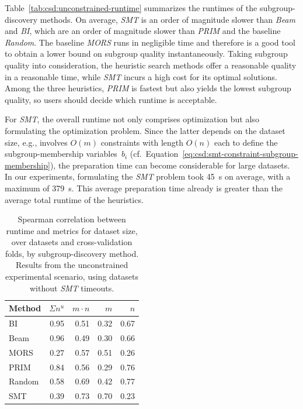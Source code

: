 \documentclass{article}
\theoremstyle{definition}
\begin{document}
Table~\ref{tab:csd:unconstrained-runtime} summarizes the runtimes of the subgroup-discovery methods.
On average, \emph{SMT} is an order of magnitude slower than \emph{Beam} and \emph{BI}, which are an order of magnitude slower than \emph{PRIM} and the baseline \emph{Random}.
The baseline \emph{MORS} runs in negligible time and therefore is a good tool to obtain a lower bound on subgroup quality instantaneously.
Taking subgroup quality into consideration, the heuristic search methods offer a reasonable quality in a reasonable time, while \emph{SMT} incurs a high cost for its optimal solutions.
Among the three heuristics, \emph{PRIM} is fastest but also yields the lowest subgroup quality, so users should decide which runtime is acceptable.

For \emph{SMT}, the overall runtime not only comprises optimization but also formulating the optimization problem.
Since the latter depends on the dataset size, e.g., involves $O(m)$ constraints with length $O(n)$ each to define the subgroup-membership variables~$b_i$ (cf.~Equation~\ref{eq:csd:smt-constraint-subgroup-membership}), the preparation time can become considerable for large datasets.
In our experiments, formulating the \emph{SMT} problem took 45~s on average, with a maximum of 379~s.
This average preparation time already is greater than the average total runtime of the heuristics.

\begin{table}[t]
	\centering
	\begin{tabular}{lrrrr}
		\toprule
		Method & $\Sigma n^u$ & $m \cdot n$ & $m$ & $n$ \\
		\midrule
		BI & 0.95 & 0.51 & 0.32 & 0.67 \\
		Beam & 0.96 & 0.49 & 0.30 & 0.66 \\
		MORS & 0.27 & 0.57 & 0.51 & 0.26 \\
		PRIM & 0.84 & 0.56 & 0.29 & 0.76 \\
		Random & 0.58 & 0.69 & 0.42 & 0.77 \\
		SMT & 0.39 & 0.73 & 0.70 & 0.23 \\
		\bottomrule
	\end{tabular}
	\caption{
		Spearman correlation between runtime and metrics for dataset size,
		over datasets and cross-validation folds, by subgroup-discovery method.
		Results from the unconstrained experimental scenario, using datasets without \emph{SMT} timeouts.
	}
	\label{tab:csd:unconstrained-runtime-correlation}
\end{table}
\end{document}
